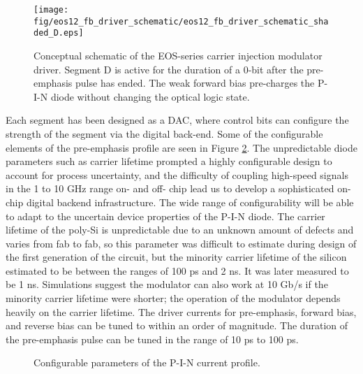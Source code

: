 	\begin{figure}[H]
		\begin{center}
			\texttt{[image: fig/eos12\_fb\_driver\_schematic/eos12\_fb\_driver\_schematic\_shaded\_D.eps]}
			\caption{\label{fig:eos12_fb_driver_schematic_shaded_D}Conceptual schematic of the EOS-series carrier injection modulator driver. Segment D is active for the duration of a 0-bit after the pre-emphasis pulse has ended.  The weak forward bias pre-charges the P-I-N diode without changing the optical logic state.}
		\end{center}
	\end{figure}


Each segment has been designed as a DAC, where control bits can configure the strength of the segment via the digital back-end.  Some of the configurable elements of the pre-emphasis profile are seen in Figure \ref{fig:preemp_profile}.  The unpredictable diode parameters such as carrier lifetime prompted a highly configurable design to account for process uncertainty, and the difficulty of coupling high-speed signals in the 1 to 10 GHz range on- and off- chip lead us to develop a sophisticated on-chip digital backend infrastructure.  The wide range of configurability will be able to adapt to the uncertain device properties of the P-I-N diode.  The carrier lifetime of the poly-Si is unpredictable due to an unknown amount of defects and varies from fab to fab, so this parameter was difficult to estimate during design of the first generation of the circuit, but the minority carrier lifetime of the silicon estimated to be between the ranges of 100 ps and 2 ns.  It was later measured to be 1 ns.  Simulations suggest the modulator can also work at 10 Gb/s if the minority carrier lifetime were shorter; the operation of the modulator depends heavily on the carrier lifetime.  The driver currents for pre-emphasis, forward bias, and reverse bias can be tuned to within an order of magnitude.  The duration of the pre-emphasis pulse can be tuned in the range of 10 ps to 100 ps.


	\begin{figure}[H]
		\begin{center}
		\end{center}
		\caption{\label{fig:preemp_profile}Configurable parameters of the P-I-N current profile.}
	\end{figure}


